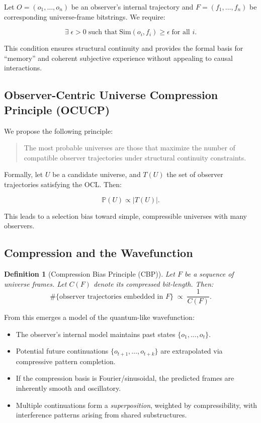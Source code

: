 \documentclass[11pt]{article}
\newtheorem{definition}{Definition}
\begin{document}
Let \(O=(o_1,\dots,o_n)\) be an observer’s internal trajectory and \(F=(f_1,\dots,f_n)\) be corresponding universe-frame bitstrings. We require:

\[
    \exists\;\epsilon>0\;\text{such that}\;\mathrm{Sim}(o_i, f_i)\ge\epsilon\;\text{for all }i.
\]

This condition ensures structural continuity and provides the formal basis for “memory” and coherent subjective experience without appealing to causal interactions.

\subsection{Observer-Centric Universe Compression Principle (OCUCP)}

We propose the following principle:

\begin{quote}
    The most probable universes are those that maximize the number of compatible observer trajectories under structural continuity constraints.
\end{quote}

Formally, let $U$ be a candidate universe, and $T(U)$ the set of observer trajectories satisfying the OCL. Then:

\[
    \mathbb{P}(U) \propto |T(U)|.
\]

This leads to a selection bias toward simple, compressible universes with many observers.

\subsection{Compression and the Wavefunction}

\begin{definition}[Compression Bias Principle (CBP)]
    Let \(F\) be a sequence of universe frames. Let \(C(F)\) denote its compressed bit-length. Then:
    \[
        \#\{\text{observer trajectories embedded in }F\}\;\propto\; \frac{1}{C(F)}.
    \]
\end{definition}

From this emerges a model of the quantum-like wavefunction:

\begin{itemize}
    \item The observer’s internal model maintains past states \(\{o_1,\dots,o_t\}\).
    \item Potential future continuations \(\{o_{t+1},\dots,o_{t+k}\}\) are extrapolated via compressive pattern completion.
    \item If the compression basis is Fourier/sinusoidal, the predicted frames are inherently smooth and oscillatory.
    \item Multiple continuations form a \emph{superposition}, weighted by compressibility, with interference patterns arising from shared substructures.
\end{itemize}
\end{document}
